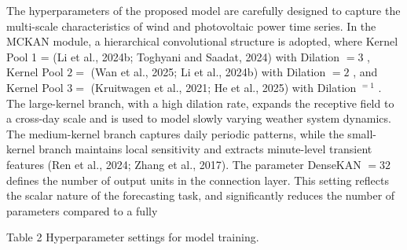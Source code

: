 \documentclass[
  10
]{article}
\begin{document}
The hyperparameters of the proposed model are carefully designed to
capture the multi-scale characteristics of wind and photovoltaic power
time series. In the MCKAN module, a hierarchical convolutional structure
is adopted, where Kernel Pool 1 = (Li et al., 2024b; Toghyani and
Saadat, 2024) with Dilation \(= 3\) , Kernel Pool \(2 =\) (Wan et al.,
2025; Li et al., 2024b) with Dilation \(= 2\) , and Kernel Pool \(3 =\)
(Kruitwagen et al., 2021; He et al., 2025) with Dilation \(^ { = 1 }\) .
The large-kernel branch, with a high dilation rate, expands the
receptive field to a cross-day scale and is used to model slowly varying
weather system dynamics. The medium-kernel branch captures daily
periodic patterns, while the small-kernel branch maintains local
sensitivity and extracts minute-level transient features (Ren et al.,
2024; Zhang et al., 2017). The parameter DenseKAN \(= 3 2\) defines the
number of output units in the connection layer. This setting reflects
the scalar nature of the forecasting task, and significantly reduces the
number of parameters compared to a fully

Table 2 Hyperparameter settings for model training.
\end{document}
